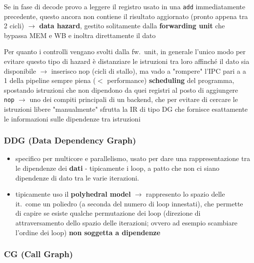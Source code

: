 \begin{example}[frametitle={Esempio: risultato di una \lstinline|add|}]
  Se in fase di decode provo a leggere il registro usato in una \lstinline|add| immediatamente precedente, questo ancora non contiene il risultato aggiornato (pronto appena tra 2 cicli) $\rightarrow$ \textbf{data hazard}, gestito solitamente dalla \textbf{forwarding unit} che bypassa MEM e WB e inoltra direttamente il dato 
\end{example}

\begin{emphasize}[frametitle={Soluzione generica (inefficiente)}]
  Per quanto i controlli vengano svolti dalla fw.~unit, in generale l'unico modo per evitare questo tipo di hazard \`e distanziare le istruzioni tra loro affinch\'e il dato sia disponibile $\rightarrow$ inserisco nop (cicli di stallo), ma vado a "rompere" l'IPC pari a a 1 della pipeline sempre piena ($<$ performance)
  \textbf{scheduling} del programma, spostando istruzioni che non dipendono da quei registri al posto di aggiungere \lstinline|nop| $\rightarrow$ uno dei compiti principali di un backend, che per evitare di cercare le istruzioni libere "manualmente" sfrutta la IR di tipo DG che fornisce esattamente le informazioni sulle dipendenze tra istruzioni
\end{emphasize}

\subsubsection{DDG (Data Dependency Graph)}

\begin{itemize}
  \item specifico per multicore e parallelismo, usato per dare una rappresentazione tra le dipendenze dei \textbf{dati} - tipicamente i loop, a patto che non ci siano dipendenze di dato tra le varie iterazioni.
  \item tipicamente uso il \textbf{polyhedral model} $\rightarrow$ rappresento lo spazio delle it.~come un poliedro (a seconda del numero di loop innestati), che permette di capire se esiste qualche permutazione dei loop (direzione di attraversamento dello spazio delle iterazioni; ovvero ad esempio scambiare l'ordine dei loop) \textbf{non soggetta a dipendenze}
\end{itemize}

\subsubsection{CG (Call Graph)}

